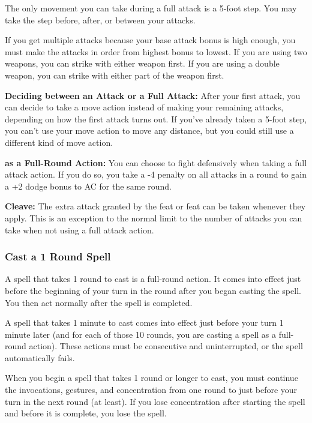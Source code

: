 The only movement you can take during a full attack is a 5-foot step. You may take 
the step before, after, or between your attacks.

If you get multiple attacks because your base attack bonus is high enough, you 
must make the attacks in order from highest bonus to lowest. If you are using two 
weapons, you can strike with either weapon first. If you are using a double weapon, 
you can strike with either part of the weapon first.

\textbf{Deciding between an Attack or a Full Attack:} After your first attack, 
you can decide to take a move action instead of making your remaining attacks, 
depending on how the first attack turns out. If you've already taken a 5-foot step, 
you can't use your move action to move any distance, but you could still use a 
different kind of move action.

\textbf{ as a Full-Round Action:} You can choose to fight defensively 
when taking a full attack action. If you do so, you take a -4 penalty on all attacks 
in a round to gain a +2 dodge bonus to AC for the same round.

\textbf{Cleave:} The extra attack granted by the  feat or  feat 
can be taken whenever they apply. This is an exception to the normal limit to the 
number of attacks you can take when not using a full attack action.

\subsubsection{Cast a 1 Round Spell}

A spell that takes 1 round to cast is a full-round action. It comes into effect 
just before the beginning of your turn in the round after you began casting the 
spell. You then act normally after the spell is completed.

A spell that takes 1 minute to cast comes into effect just before your turn 1 minute 
later (and for each of those 10 rounds, you are casting a spell as a full-round 
action). These actions must be consecutive and uninterrupted, or the spell automatically 
fails.

When you begin a spell that takes 1 round or longer to cast, you must continue 
the invocations, gestures, and concentration from one round to just before your 
turn in the next round (at least). If you lose concentration after starting the 
spell and before it is complete, you lose the spell.

